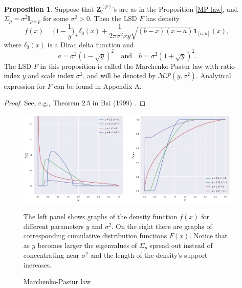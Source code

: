 \documentclass[a4paper,11pt]{book}
\theoremstyle{plain}
\theoremstyle{definition}
\newtheorem{prps}[thm]{Proposition}
\begin{document}
	\begin{prps} \label{one-dim MP}
		Suppose that $\mathbf{Z}_\ell^{(p)}$'s are as in the Proposition \ref{MP law}, and $\Sigma_p = \sigma^2 \mathbb{I}_{p \times p}$ for some $\sigma^2>0$. Then the LSD $F$ has density
		\[ f(x) = \Big(1-\frac{1}{y}\Big)_+\delta_0(x) + \frac{1}{2 \pi \sigma^2 xy} \sqrt{(b-x)(x-a)} \mathbf{1}_{[a,b]}(x), \]
		where $\delta_0(x)$ is a Dirac delta function and
		\[ a = \sigma^2(1-\sqrt{y})^2 \quad \text{and} \quad b = \sigma^2(1+\sqrt{y})^2. \]
		The LSD $F$ in this proposition is called the Marchenko-Pastur law with ratio index $y$ and scale index $\sigma^2$, and will be denoted by $\mathcal{MP}(y, \sigma^2)$. Analytical expression for $F$ can be found in Appendix A.
	\end{prps}
	\begin{proof}
		See, e.g., Theorem 2.5 in Bai (1999) \cite{Bai}.
	\end{proof}
	\begin{figure}
		\begin{center} \centering
			\includegraphics[scale=0.4]{MP}
			\caption{Marchenko-Pastur law}
			\smallskip
			\small
			The left panel shows graphs of the density function $f(x)$ for different parameters $y$ and $\sigma^2$. On the right there are graphs of corresponding cumulative distribution functions $F(x)$. Notice that as $y$ becomes larger the eigenvalues of $\Sigma_p$ spread out instead of concentrating near $\sigma^2$ and the length of the density's support increases.
		\end{center}
	\end{figure}
	
\end{document}
